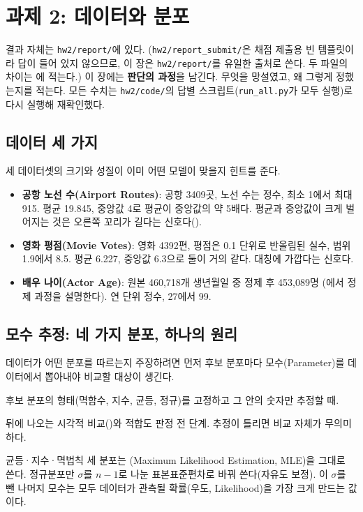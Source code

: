 \chapter{과제 2: 데이터와 분포}
\label{ch:hw2}

\begin{aside}
결과 자체는 \texttt{hw2/report/}에 있다. (\texttt{hw2/report\_submit/}은 채점 제출용
빈 템플릿이라 답이 들어 있지 않으므로, 이 장은 \texttt{hw2/report/}를 유일한 출처로
쓴다. 두 파일의 차이는 에 적는다.) 이 장에는 \textbf{판단의 과정}을
남긴다. 무엇을 망설였고, 왜 그렇게 정했는지를 적는다. 모든 수치는
\texttt{hw2/code/}의 답별 스크립트(\texttt{run\_all.py}가 모두 실행)로 다시 실행해 재확인했다.
\end{aside}

\section{데이터 세 가지}
\label{sec:hw2-data}

세 데이터셋의 크기와 성질이 이미 어떤 모델이 맞을지 힌트를 준다.

\begin{itemize}
  \item \textbf{공항 노선 수(Airport Routes)}: 공항 3409곳, 노선 수는 정수, 최소 1에서
    최대 915. 평균 19.845, 중앙값 4로 평균이 중앙값의 약 5배다. 평균과 중앙값이 크게
    벌어지는 것은 오른쪽 꼬리가 길다는 신호다().
  \item \textbf{영화 평점(Movie Votes)}: 영화 4392편, 평점은 0.1 단위로 반올림된 실수,
    범위 1.9에서 8.5. 평균 6.227, 중앙값 6.3으로 둘이 거의 같다. 대칭에 가깝다는 신호다.
  \item \textbf{배우 나이(Actor Age)}: 원본 460{,}718개 생년월일 중 정제 후 453{,}089명
    (에서 정제 과정을 설명한다). 연 단위 정수, 27에서 99.
\end{itemize}

\section{모수 추정: 네 가지 분포, 하나의 원리}
\label{sec:hw2-estimators}

\begin{inbrief}
  \item[Why] 데이터가 어떤 분포를 따르는지 주장하려면 먼저 후보 분포마다 모수(Parameter)를
    데이터에서 뽑아내야 비교할 대상이 생긴다.
  \item[When] 후보 분포의 형태(멱함수, 지수, 균등, 정규)를 고정하고 그 안의 숫자만
    추정할 때.
  \item[Where] 뒤에 나오는 시각적 비교()와 적합도 판정
    전 단계. 추정이 틀리면 비교 자체가 무의미하다.
  \item[How] 균등·지수·멱법칙 세 분포는 (Maximum Likelihood
    Estimation, MLE)을 그대로 쓴다. 정규분포만 $\sigma$를 $n-1$로 나눈 표본표준편차로
    바꿔 쓴다(자유도 보정). 이 $\sigma$를 뺀 나머지 모수는 모두 데이터가 관측될
    확률(우도, Likelihood)을 가장 크게 만드는 값이다.
\end{inbrief}

